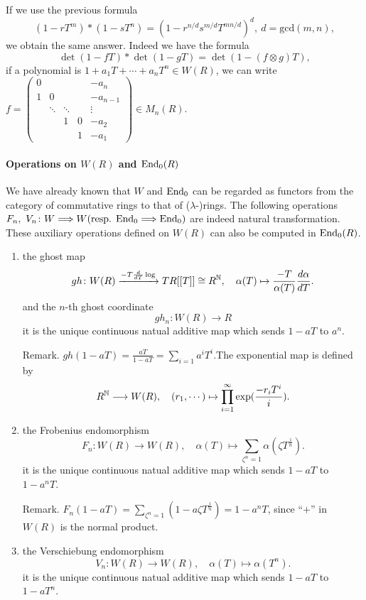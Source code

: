 If we use the previous formula 
\[(1-rT^m)*(1-sT^n)=(1-r^{n/d}s^{m/d}T^{mn/d})^d,\ d=\mbox{gcd}(m,n),\]
we obtain the same answer. Indeed we have the formula 
\[\det (1-fT)*\det(1-gT)=\det(1-(f\otimes g)T),\]
if a polynomial is $1 + a_1T+ \cdots + a_nT^n\in W(R)$, we can write $f=\begin{pmatrix}
	0& & & & -a_n\\
	1&0& & & -a_{n-1}\\
	 &\ddots&\ddots& &\vdots\\
	 & & 1&0&-a_2\\
	 & & & 1&-a_1 
\end{pmatrix}\in M_n(R)$.

\paragraph{Operations on $W(R)$ and $\mathrm{End}_0(R)$}
We have already known that $W$ and $\mathrm{End}_0$ can be regarded as functors from the category of commutative rings to that of ($\lambda$-)rings. The following operations $F_n,\  V_n \colon W \Longrightarrow W (\mbox{resp. }\mathrm{End}_0 \Longrightarrow \mathrm{End}_0) $ are indeed natural transformation.
These auxiliary operations defined on $W(R)$ can also be computed in $\mathrm{End}_0(R)$.
\begin{enumerate}
	\item the ghost map 
	\[gh \colon W(R) \xrightarrow{-T\frac{d}{dT}\log} TR[[T]] \cong R^{\mathbb{N}},\quad \alpha(T)\mapsto \frac{-T}{\alpha(T)} \frac{d\alpha}{d T}. \] 
	and  the $n$-th ghost coordinate 
	\[gh_n \colon W(R)\longrightarrow R\]
	it is the unique continuous natual additive map which sends $1-aT$ to $a^n$.

	Remark. $gh(1-aT)=\frac{aT}{1-aT}=\sum_{i=1} a^iT^i$.The exponential map is defined by
	\[R^{\mathbb{N}}\longrightarrow W(R),\quad (r_1,\cdots) \mapsto \prod_{i=1}^\infty \exp (\frac{-r_i T^i}{i}). \]
	

	\item the Frobenius endomorphism
	\[F_n \colon W(R)\longrightarrow W(R),\quad \alpha(T)\mapsto \sum_{\zeta^n=1}\alpha(\zeta T^{\frac{1}{n}}). \]
	it is the unique continuous natual additive map which sends $1-aT$ to $1-a^nT$.

	Remark. $F_n(1-aT)=\sum_{\zeta^n=1}(1-a\zeta T^{\frac{1}{n}})=1-a^nT $, since ``$+$'' in $W(R)$ is the normal product.

	\item the Verschiebung endomorphism
	\[V_n \colon W(R)\longrightarrow W(R),\quad \alpha(T)\mapsto \alpha(T^n). \]
	it is the unique continuous natual additive map which sends $1-aT$ to $1-aT^n$.
\end{enumerate}
